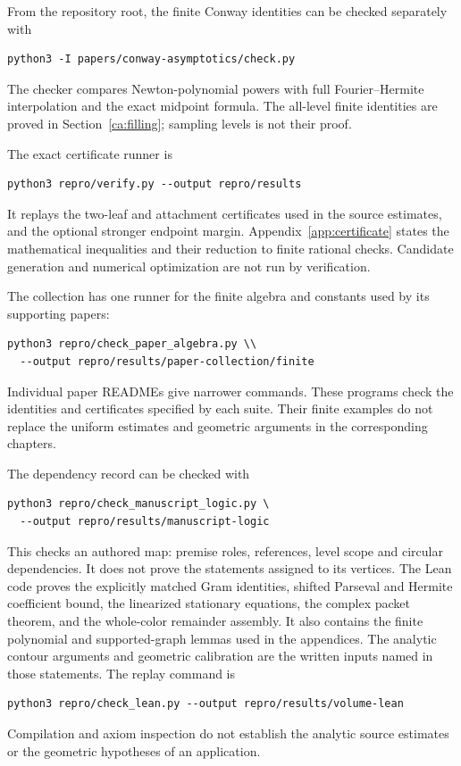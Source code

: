 From the repository root, the finite Conway identities can be
checked separately with
\begin{verbatim}
python3 -I papers/conway-asymptotics/check.py
\end{verbatim}
The checker compares Newton-polynomial powers with full
Fourier--Hermite interpolation and the exact midpoint formula.
The all-level finite identities are proved in
Section~\ref{ca:filling}; sampling levels is not their proof.

The exact certificate runner is
\begin{verbatim}
python3 repro/verify.py --output repro/results
\end{verbatim}
It replays the two-leaf and attachment certificates used in the
source estimates, and the optional stronger endpoint margin.
Appendix~\ref{app:certificate} states the mathematical
inequalities and their reduction to finite rational checks.
Candidate generation and numerical optimization are not run by
verification.

The collection has one runner for the finite algebra and constants
used by its supporting papers:
\begin{verbatim}
python3 repro/check_paper_algebra.py \\
  --output repro/results/paper-collection/finite
\end{verbatim}
Individual paper READMEs give narrower commands. These programs check
the identities and certificates specified by each suite. Their finite
examples do not replace the uniform estimates and geometric arguments
in the corresponding chapters.

The dependency record can be checked with
\begin{verbatim}
python3 repro/check_manuscript_logic.py \
  --output repro/results/manuscript-logic
\end{verbatim}
This checks an authored map: premise roles, references, level
scope and circular dependencies. It does not prove the statements
assigned to its vertices. The Lean code proves the explicitly matched Gram identities,
shifted Parseval and Hermite coefficient bound, the linearized stationary
equations, the complex packet theorem, and the whole-color remainder
assembly. It also contains the finite polynomial and supported-graph
lemmas used in the appendices. The analytic contour arguments and
geometric calibration are the written inputs named in those statements.
The replay command is
\begin{verbatim}
python3 repro/check_lean.py --output repro/results/volume-lean
\end{verbatim}
Compilation and axiom inspection do not establish the analytic
source estimates or the geometric hypotheses of an application.

